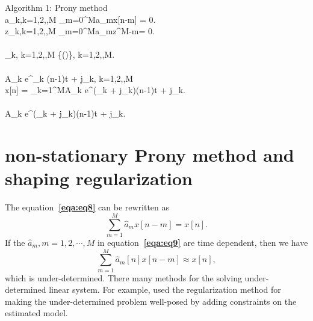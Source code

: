 \begin{algorithm}{Algorithm 1: Prony method}{}
       \\
     \displaystyle a_k,k=1,2,\cdots,M \gets \sum_{m=0}^{M}a_mx[n-m] = 0. \\
      \displaystyle z_k,k=1,2,\cdots,M \gets \sum_{m=0}^{M}a_mz^{M-m}= 0.\\
      \\  
     \displaystyle
     \omega_k, k=1,2,\cdots,M \gets \Re\left\{\left(\right)\right\}, k=1,2,\cdots,M.\\
      \displaystyle \\
     A_k e^{\alpha_k (n-1)\Delta t + j\phi_k}, k=1,2,\cdots,M \gets  \\
     x[n] = \sum_{k=1}^{M}A_k e^{(\alpha_k + j\omega_k)(n-1)\Delta t + j\phi_k}.\\
      \\
     \displaystyle  
     A_k e^{(\alpha_k + j\omega_k)(n-1)\Delta t + j\phi_k}. \\
\end{algorithm}


\section{non-stationary Prony method and shaping regularization}
The equation\textbf{~\ref{eqa:eq8}} can be rewritten as
\begin{equation}
    \label{eqa:eq9}
\sum_{m=1}^{M}\hat{a}_m x[n-m] = x[n].
\end{equation}
If the $\hat{a}_m, m=1,2,\cdots,M$ in equation\textbf{~\ref{eqa:eq9}} are time dependent, then we have
\begin{equation}
    \label{eqa:eq10}
    \sum_{m=1}^{M}\hat{a}_m[n] x[n-m] \approx x[n],
\end{equation}
which is under-determined. There many methods for the solving 
under-determined linear system. For example, \citet[]{tikhonov} 
used the regularization method for making the under-determined 
problem well-posed by adding constraints on the estimated model.
